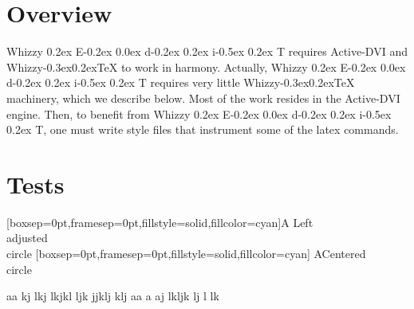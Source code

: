 \documentclass[12pt]{article}
\title{\huge \WhizzyEdit}
\author {Didier R{\'e}my}
\makeatletter
\def \ActiveDVI {Active-DVI}
\def \WhizzyTeX {{Whizzy\kern -0.3ex\raise 0.2ex\hbox{\let \@\relax\TeX}}}
\def \WhizzyEdit {Whizzy\sc 
\raise 0.2ex \hbox{E}\kern -0.2ex%
\lower 0.0ex \hbox{d}\kern -0.2ex%
\lower 0.2ex \hbox{i}\kern -0.5ex%
\raise 0.2ex \hbox{T}}%
\makeatother
\begin{document}
\maketitle

\begin{abstract}
This requires the use of \verb"advi" and of a
recent version that recognized \verb"advi: edit" specials.
See the {\ActiveDVI} and {\WhizzyEdit} related parts of the documentaion.
\end{abstract}

\section{Overview}

{\WhizzyEdit} requires {\ActiveDVI} and {\WhizzyTeX} to work in harmony. 
Actually, {\WhizzyEdit} requires very little {\WhizzyTeX} machinery, which we
describe below. Most of the work resides in the {\ActiveDVI} engine. 
Then, to benefit from {\WhizzyEdit}, one must write style files that
instrument some of the latex commands. 



\section {Tests}

\vspace {8em}

\makeatletter

\makeatletter

\noindent
{}
  [boxsep=0pt,framesep=0pt,fillstyle=solid,fillcolor=cyan]{A}%
  {Left \\adjusted\\ circle}%
   [boxsep=0pt,framesep=0pt,fillstyle=solid,fillcolor=cyan]%
   {A}{Centered\\ circle}%

  {\hsize \adviw\vbox{aa kj lkj lkjkl ljk jjklj klj  
  {}%
aa a aj lkljk lj l lk }}%
%
  {\hsize \adviw{}}%
%
  {\hsize \adviw{}}%
\end{document}
